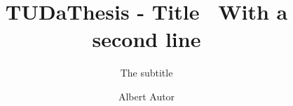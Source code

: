 \documentclass[
	ngerman,
	ruledheaders=section,%
	class=report,%
	thesis={type=bachelor},%
	accentcolor=9c,%
	custommargins=true,%
	marginpar=false,%
	parskip=half-,%
	fontsize=11pt,%
]{tudapub}
\begin{document}


\title{TUDaThesis - Title \ With a second line}
\subtitle{The subtitle} 
\author[Albert Autor]{Albert Autor}%


\submissiondate{\today}
\examdate{\today}



\clearpage
\setcounter{page}{1}
\maketitle

%
\affidavit
\end{document}
